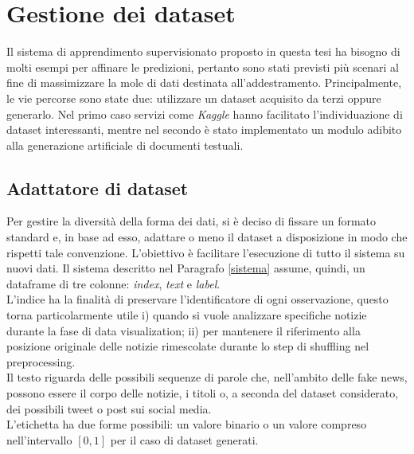 \documentclass[12pt]{report}
\theoremstyle{definition}
\begin{document}
\section{Gestione dei dataset}\label{datasethandle}
Il sistema di apprendimento supervisionato proposto in questa tesi ha bisogno di molti esempi per affinare le predizioni, pertanto sono stati previsti più scenari al fine di massimizzare la mole di dati destinata all'addestramento. Principalmente, le vie percorse sono state due: utilizzare un dataset acquisito da terzi oppure generarlo.
Nel primo caso servizi come \textit{Kaggle} hanno facilitato l'individuazione di dataset interessanti, mentre nel secondo è stato implementato un modulo adibito alla generazione artificiale di documenti testuali.

\subsection{Adattatore di dataset}\label{adapter}
Per gestire la diversità della forma dei dati, si è deciso di fissare un formato standard e, in base ad esso, adattare o meno il dataset a disposizione in modo che rispetti tale convenzione. L'obiettivo è facilitare l'esecuzione di tutto il sistema su nuovi dati.
Il sistema descritto nel Paragrafo \ref{sistema} assume, quindi, un dataframe di tre colonne: \textit{index}, \textit{text} e \textit{label}.
\\
L'indice ha la finalità di preservare l'identificatore di ogni osservazione, questo torna particolarmente utile i) quando si vuole analizzare specifiche notizie durante la fase di data visualization; ii) per mantenere il riferimento alla posizione originale delle notizie rimescolate durante lo step di shuffling nel preprocessing.
\\
Il testo riguarda delle possibili sequenze di parole che, nell'ambito delle fake news, possono essere il corpo delle notizie, i titoli o, a seconda del dataset considerato, dei possibili tweet o post sui social media.
\\
L'etichetta ha due forme possibili: un valore binario o un valore compreso nell'intervallo $[0,1]$ per il caso di dataset generati.
\end{document}
